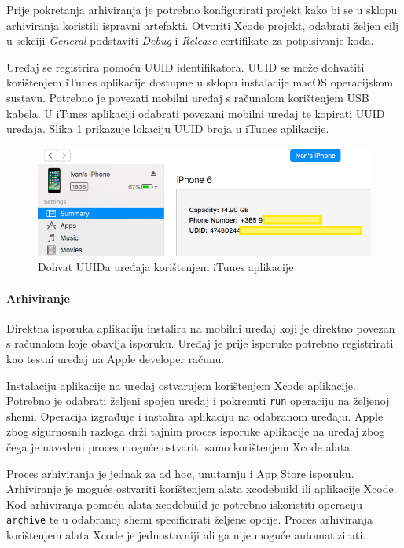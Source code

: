\documentclass[times, utf8, diplomski, numeric]{fer}
\begin{document}
\begin{appendices}
Prije pokretanja arhiviranja je potrebno konfigurirati projekt kako bi se u sklopu arhiviranja koristili ispravni artefakti. Otvoriti Xcode projekt, odabrati željen cilj u sekciji \textit{General} podstaviti \textit{Debug} i \textit{Release} certifikate za potpisivanje koda.

Uređaj se registrira pomoću UUID identifikatora. UUID se može dohvatiti korištenjem iTunes aplikacije dostupne u sklopu instalacije macOS operacijskom sustavu. Potrebno je povezati mobilni uređaj s računalom korištenjem USB kabela. U iTunes aplikaciji odabrati povezani mobilni uređaj te kopirati UUID uređaja. Slika \ref{fig:iTunesUUID} prikazuje lokaciju UUID broja u iTunes aplikacije.

\begin{figure}[h!]
\centering
\includegraphics[scale=0.5]{iTunesUUID}
\caption{Dohvat UUIDa uređaja korištenjem iTunes aplikacije}
\label{fig:iTunesUUID}
\end{figure}

\paragraph{Arhiviranje}

Direktna isporuka aplikaciju instalira na mobilni uređaj koji je direktno povezan s računalom koje obavlja isporuku. Uređaj je prije isporuke potrebno registrirati kao testni uređaj na Apple developer računu.

Instalaciju aplikacije na uređaj ostvarujem korištenjem Xcode aplikacije. Potrebno je odabrati željeni spojen uređaj i pokrenuti \verb|run| operaciju na željenoj shemi. Operacija izgrađuje i instalira aplikaciju na odabranom uređaju. Apple zbog sigurnosnih razloga drži tajnim proces isporuke aplikacije na uređaj zbog čega je navedeni proces moguće ostvariti samo korištenjem Xcode alata.

Proces arhiviranja je jednak za ad hoc, unutarnju i App Store isporuku. Arhiviranje je moguće ostvariti korištenjem alata xcodebuild ili aplikacije Xcode. Kod arhiviranja pomoću alata xcodebuild je potrebno iskoristiti operaciju \verb|archive| te u odabranoj shemi specificirati željene opcije. Proces arhiviranja korištenjem alata Xcode je jednostavniji ali ga nije moguće automatizirati.


\end{appendices}
\end{document}
